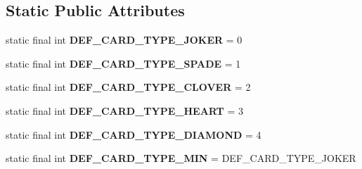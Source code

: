 \subsection*{Static Public Attributes}
\begin{DoxyCompactItemize}
\item 
\mbox{\label{classjp_1_1gr_1_1java__conf_1_1yuta__yoshinaga_1_1java__trumpcards_1_1_card_ae88b4667b9e3b3921267685d1d601799}} 
static final int {\bfseries D\+E\+F\+\_\+\+C\+A\+R\+D\+\_\+\+T\+Y\+P\+E\+\_\+\+J\+O\+K\+ER} = 0
\item 
\mbox{\label{classjp_1_1gr_1_1java__conf_1_1yuta__yoshinaga_1_1java__trumpcards_1_1_card_afdfc14b6408462a614e512b1329327f6}} 
static final int {\bfseries D\+E\+F\+\_\+\+C\+A\+R\+D\+\_\+\+T\+Y\+P\+E\+\_\+\+S\+P\+A\+DE} = 1
\item 
\mbox{\label{classjp_1_1gr_1_1java__conf_1_1yuta__yoshinaga_1_1java__trumpcards_1_1_card_a4286dd64dc393577368e71a1c969a14a}} 
static final int {\bfseries D\+E\+F\+\_\+\+C\+A\+R\+D\+\_\+\+T\+Y\+P\+E\+\_\+\+C\+L\+O\+V\+ER} = 2
\item 
\mbox{\label{classjp_1_1gr_1_1java__conf_1_1yuta__yoshinaga_1_1java__trumpcards_1_1_card_a8c257e8baa0cf6dce69a386e869e4c81}} 
static final int {\bfseries D\+E\+F\+\_\+\+C\+A\+R\+D\+\_\+\+T\+Y\+P\+E\+\_\+\+H\+E\+A\+RT} = 3
\item 
\mbox{\label{classjp_1_1gr_1_1java__conf_1_1yuta__yoshinaga_1_1java__trumpcards_1_1_card_a3461c036ef26d9444ff4d7f8a21266a7}} 
static final int {\bfseries D\+E\+F\+\_\+\+C\+A\+R\+D\+\_\+\+T\+Y\+P\+E\+\_\+\+D\+I\+A\+M\+O\+ND} = 4
\item 
\mbox{\label{classjp_1_1gr_1_1java__conf_1_1yuta__yoshinaga_1_1java__trumpcards_1_1_card_a82273fbdd1db45d311f6200597d8b2ff}} 
static final int {\bfseries D\+E\+F\+\_\+\+C\+A\+R\+D\+\_\+\+T\+Y\+P\+E\+\_\+\+M\+IN} = D\+E\+F\+\_\+\+C\+A\+R\+D\+\_\+\+T\+Y\+P\+E\+\_\+\+J\+O\+K\+ER

\end{DoxyCompactItemize}
